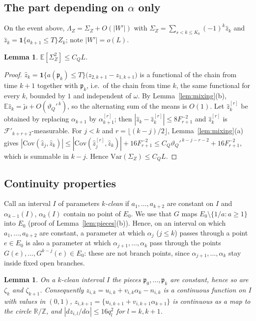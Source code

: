 \documentclass[11pt]{amsart}
\newtheorem{lemma}[theorem]{Lemma}
\theoremstyle{definition}
\numberwithin{equation}{section}
\newcommand{\R}{\mathbb{R}}
\newcommand{\Z}{\mathbb{Z}}
\newcommand{\E}{\mathbb{E}}
\newcommand{\cF}{\mathcal{F}}
\newcommand{\fp}{\mathfrak{p}}
\newcommand{\fr}[1]{\{#1\}}
\newcommand{\ind}{\mathbf{1}}
\begin{document}
\subsection{The part depending on $\alpha$ only}
On the event above, $\Lambda_Z=\Sigma_Z+O(|W'|)$ with $\Sigma_Z=\sum_{s<k\le K_0}(-1)^k\hat z_k$ and $\hat z_k=\ind\{a_{k+1}\le T\}Z_k$; note $|W'|=o(L)$.

\begin{lemma}\label{lem:sigmaZ}
$\E[\Sigma_Z^2]\le C_QL$.
\end{lemma}

\begin{proof}
$\hat z_k=\ind\{a(\fp_k)\le T\}\big(z_{2,k+1}-z_{1,k+1}\big)$ is a functional of the chain from time $k+1$ together with $\fp_k$, i.e.\ of the chain from time $k$,
the same functional for every $k$, bounded by $1$ and independent of $\omega$. By Lemma~\ref{lem:mixing}(b), $\E\hat z_k=\tilde\mu+O(\vartheta_Q'^{\,k})$, so the
alternating sum of the means is $O(1)$. Let $\hat z^{[r]}_k$ be obtained by replacing $\alpha_{k+1}$ by $\alpha^{[r]}_{k+1}$; then
$|\hat z_k-\hat z_k^{[r]}|\le8F_{r+1}^{-2}$ and $\hat z^{[r]}_k$ is $\cF'_{k+r+2}$-measurable. For $j<k$ and $r=\lfloor(k-j)/2\rfloor$, Lemma~\ref{lem:mixing}(a)
gives $|\mathrm{Cov}(\hat z_j,\hat z_k)|\le|\mathrm{Cov}(\hat z^{[r]}_j,\hat z_k)|+16F_{r+1}^{-2}\le C_Q\vartheta_Q'^{\,k-j-r-2}+16F_{r+1}^{-2}$, which is summable in
$k-j$. Hence $\mathrm{Var}(\Sigma_Z)\le C_QL$.
\end{proof}

\subsection{Continuity properties}
Call an interval $I$ of parameters \emph{$k$-clean} if $a_1,\dots,a_{k+2}$ are constant on $I$ and $\alpha_{k-1}(I)$, $\alpha_k(I)$ contain no point of
$E_0$. We use that $G$ maps $E_0\setminus\{1/a:a\ge1\}$ into $E_0$ (proof of Lemma~\ref{lem:pieces}(b)). Hence, on an interval on which $a_1,\dots,a_{k+2}$
are constant, a parameter at which $\alpha_j$ ($j\le k$) passes through a point $e\in E_0$ is also a parameter at which $\alpha_{j+1},\dots,\alpha_k$ pass
through the points $G(e),\dots,G^{k-j}(e)\in E_0$: these are not branch points, since $\alpha_{j+1},\dots,\alpha_k$ stay inside fixed open branches.

\begin{lemma}\label{lem:zcont}
On a $k$-clean interval $I$ the pieces $\fp_0,\dots,\fp_k$ are constant, hence so are $\zeta_k$ and $\zeta_{k+1}$. Consequently $z_{i,k}=u_{i,k}+v_{i,k}\alpha_k-n_{i,k}$ is a
continuous function on $I$ with values in $(0,1)$, $z_{i,k+1}=\fr{u_{i,k+1}+v_{i,k+1}\alpha_{k+1}}$ is continuous as a map to the circle $\R/\Z$, and
$|dz_{i,l}/d\alpha|\le16q_l^2$ for $l=k,k+1$.
\end{lemma}
\end{document}
